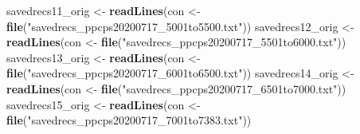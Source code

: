 \documentclass[
]{article}
\newenvironment{Shaded}{\begin{snugshade}}{\end{snugshade}}
\newcommand{\KeywordTok}[1]{\textcolor[rgb]{0.13,0.29,0.53}{\textbf{#1}}}
\newcommand{\NormalTok}[1]{#1}
\newcommand{\StringTok}[1]{\textcolor[rgb]{0.31,0.60,0.02}{#1}}
\begin{document}
\begin{Shaded}
\begin{Highlighting}[]
\NormalTok{savedrecs11_orig <-}\StringTok{ }\KeywordTok{readLines}\NormalTok{(con <-}\StringTok{ }\KeywordTok{file}\NormalTok{(}\StringTok{"savedrecs_ppcps20200717_5001to5500.txt"}\NormalTok{))}
\NormalTok{savedrecs12_orig <-}\StringTok{ }\KeywordTok{readLines}\NormalTok{(con <-}\StringTok{ }\KeywordTok{file}\NormalTok{(}\StringTok{"savedrecs_ppcps20200717_5501to6000.txt"}\NormalTok{))}
\NormalTok{savedrecs13_orig <-}\StringTok{ }\KeywordTok{readLines}\NormalTok{(con <-}\StringTok{ }\KeywordTok{file}\NormalTok{(}\StringTok{"savedrecs_ppcps20200717_6001to6500.txt"}\NormalTok{))}
\NormalTok{savedrecs14_orig <-}\StringTok{ }\KeywordTok{readLines}\NormalTok{(con <-}\StringTok{ }\KeywordTok{file}\NormalTok{(}\StringTok{"savedrecs_ppcps20200717_6501to7000.txt"}\NormalTok{))}
\NormalTok{savedrecs15_orig <-}\StringTok{ }\KeywordTok{readLines}\NormalTok{(con <-}\StringTok{ }\KeywordTok{file}\NormalTok{(}\StringTok{"savedrecs_ppcps20200717_7001to7383.txt"}\NormalTok{))}



\end{Highlighting}
\end{Shaded}
\end{document}
